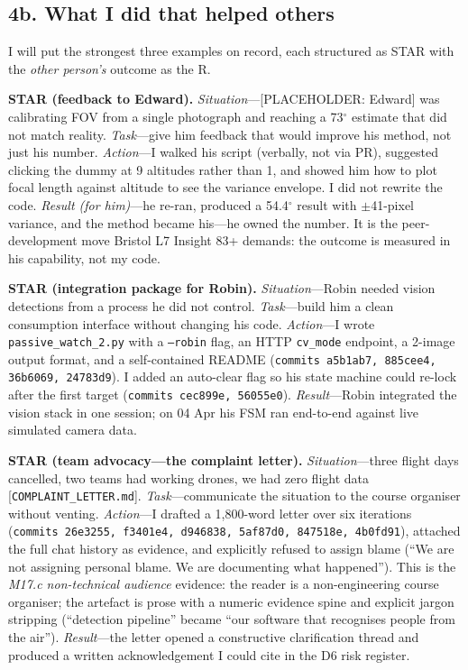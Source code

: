 \subsection*{4b. What I did that helped others }
\www I will put the strongest three examples on record, each structured as STAR with the \emph{other person's} outcome as the R.

\www \textbf{STAR (feedback to Edward).} \emph{Situation}---[PLACEHOLDER: Edward] was calibrating FOV from a single photograph and reaching a 73$^{\circ}$ estimate that did not match reality. \emph{Task}---give him feedback that would improve his method, not just his number. \emph{Action}---I walked his script (verbally, not via PR), suggested clicking the dummy at 9 altitudes rather than 1, and showed him how to plot focal length against altitude to see the variance envelope. I did not rewrite the code. \emph{Result (for him)}---he re-ran, produced a 54.4$^{\circ}$ result with $\pm$41-pixel variance, and the method became his---he owned the number. It is the peer-development move Bristol L7 Insight 83+ demands: the outcome is measured in his capability, not my code.

\www \textbf{STAR (integration package for Robin).} \emph{Situation}---Robin needed vision detections from a process he did not control. \emph{Task}---build him a clean consumption interface without changing his code. \emph{Action}---I wrote \texttt{passive\_watch\_2.py} with a \texttt{--robin} flag, an HTTP \texttt{cv\_mode} endpoint, a 2-image output format, and a self-contained README (\texttt{commits a5b1ab7, 885cee4, 36b6069, 24783d9}). I added an auto-clear flag so his state machine could re-lock after the first target (\texttt{commits cec899e, 56055e0}). \emph{Result}---Robin integrated the vision stack in one session; on 04 Apr his FSM ran end-to-end against live simulated camera data.

\www \textbf{STAR (team advocacy---the complaint letter).} \emph{Situation}---three flight days cancelled, two teams had working drones, we had zero flight data [\texttt{COMPLAINT\_LETTER.md}]. \emph{Task}---communicate the situation to the course organiser without venting. \emph{Action}---I drafted a 1,800-word letter over six iterations (\texttt{commits 26e3255, f3401e4, d946838, 5af87d0, 847518e, 4b0fd91}), attached the full chat history as evidence, and explicitly refused to assign blame (``We are not assigning personal blame. We are documenting what happened''). This is the \emph{M17.c non-technical audience} evidence: the reader is a non-engineering course organiser; the artefact is prose with a numeric evidence spine and explicit jargon stripping (``detection pipeline'' became ``our software that recognises people from the air''). \emph{Result}---the letter opened a constructive clarification thread and produced a written acknowledgement I could cite in the D6 risk register.

